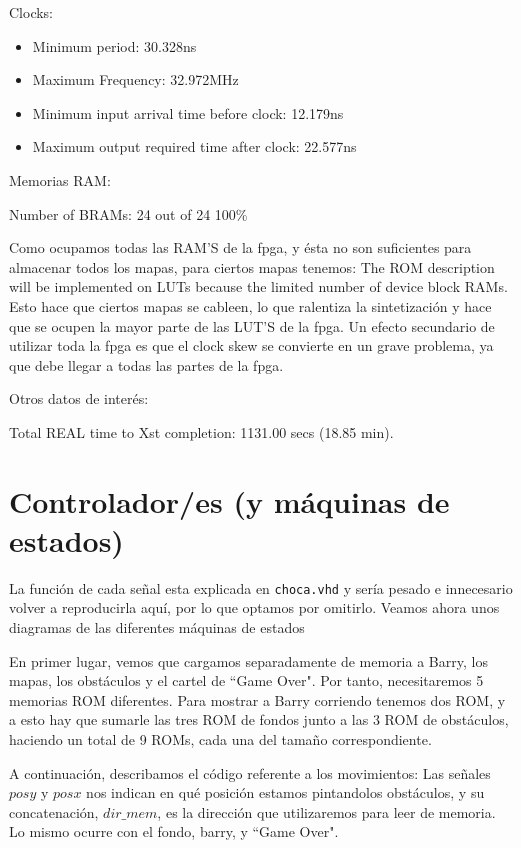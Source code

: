 \documentclass[11pt, a4paper, spanish, openright, twoside]{book}
\begin{document}
	Clocks:
	\begin{itemize}
	\item  Minimum period: 30.328ns 
	\item 	Maximum Frequency: 32.972MHz
 	\item  Minimum input arrival time before clock: 12.179ns
   	\item Maximum output required time after clock: 22.577ns

\end{itemize}
	Memorias RAM:
	
	Number of BRAMs:    24  out of     24   100\%  

	Como ocupamos todas las RAM'S de la fpga, y ésta no son suficientes para almacenar todos los mapas, para ciertos mapas tenemos:
		The ROM description  will be implemented on LUTs because the limited number of device block RAMs.
	Esto hace que ciertos mapas se cableen, lo que ralentiza la sintetización y hace que se ocupen la mayor parte de las LUT'S de la fpga.
	Un efecto secundario de utilizar toda la fpga es que el clock skew se convierte en un grave problema, ya que debe llegar a todas 
	 las partes de la fpga.

	Otros datos de interés:
	
	Total REAL time to Xst completion: 1131.00 secs (18.85 min).

\section{Controlador/es (y máquinas de estados)}
La función de cada señal esta explicada en \texttt{choca.vhd} y sería pesado e innecesario volver a reproducirla aquí, por lo que optamos por omitirlo.
Veamos ahora unos diagramas de las diferentes máquinas de estados

En primer lugar, vemos que cargamos separadamente de memoria a Barry,  los mapas, los obstáculos y el cartel de ``Game Over". Por tanto, necesitaremos 5 memorias ROM diferentes. Para mostrar a Barry corriendo tenemos dos ROM, y a esto hay que sumarle las tres ROM de fondos junto a las 3 ROM de obstáculos, haciendo un total de 9 ROMs, cada una del tamaño correspondiente. 

A continuación, describamos el código referente a los movimientos:
Las señales $posy$ y $posx$ nos indican en qué posición estamos pintandolos obstáculos, y su concatenación, $dir\_mem$, es la dirección que utilizaremos para leer de memoria. Lo mismo ocurre con el fondo, barry, y ``Game Over".
\end{document}
